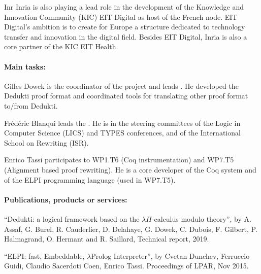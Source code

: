 \begin{sitedescription}{Inr}
Inria is also playing a lead role in the development of the Knowledge and Innovation Community (KIC) EIT Digital as host of the French node. EIT Digital’s ambition is to create for Europe a structure dedicated to technology transfer and innovation in the digital field. Besides EIT Digital, Inria is also a core partner of the KIC EIT Health.

\paragraph{Main tasks:}


\begin{compactitem}
\item Gilles Dowek is the coordinator of the project and leads
  . He developed the Dedukti proof format and
  coordinated tools for translating other proof format to/from
  Dedukti.
\item Frédéric Blanqui leads the . He is in the
  steering committees of the Logic in Computer Science (LICS) and
  TYPES conferences, and of the International School on Rewriting
  (ISR).
\item Enrico Tassi participates to WP1.T6 (Coq
instrumentation) and WP7.T5 (Alignment based proof rewriting). He is a core
developer of the Coq system and of the ELPI programming language (used in WP7.T5).
\end{compactitem}

\paragraph{Publications, products or services:}


\begin{compactitem}
\item ``Dedukti: a logical framework based on the $\lambda\Pi$-calculus modulo theory'', by A. Assaf, G. Burel, R. Cauderlier, D. Delahaye, G. Dowek, C. Dubois, F. Gilbert, P. Halmagrand, O. Hermant and R. Saillard, Technical report, 2019.
\item ``ELPI: fast, Embeddable, $\lambda$Prolog Interpreter'', by Cvetan Dunchev, Ferruccio Guidi, Claudio Sacerdoti Coen, Enrico Tassi. Proceedings of LPAR, Nov 2015.
\end{compactitem}


\end{sitedescription}
